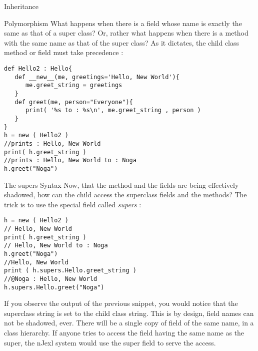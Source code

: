 \begin{section}{Inheritance}
\begin{subsection}{Polymorphism}
What happens when there is a field whose name
is exactly the same as that of a super class?
Or, rather what happens when there is a method
with the same name as that of the super class?
As it dictates, the child class method or field must
take precedence :

\begin{center}\begin{minipage}{\linewidth}
\begin{lstlisting}[style=JexlStyle]
def Hello2 : Hello{
   def __new__(me, greetings='Hello, New World'){
      me.greet_string = greetings
   } 
   def greet(me, person="Everyone"){
      print( '%s to : %s\n', me.greet_string , person )
   }  
}
h = new ( Hello2 )
//prints : Hello, New World
print( h.greet_string )
//prints : Hello, New World to : Noga
h.greet("Noga")
\end{lstlisting}  
\end{minipage}\end{center}

\end{subsection}

\begin{subsection}{The supers Syntax}
Now, that the method and the fields are being effectively shadowed, 
how can the child access the superclass fields and the methods?
The trick is to use the special field called \emph{supers} :

\begin{center}\begin{minipage}{\linewidth}
\begin{lstlisting}[style=JexlStyle]
h = new ( Hello2 )
// Hello, New World
print( h.greet_string )
// Hello, New World to : Noga
h.greet("Noga")
//Hello, New World
print ( h.supers.Hello.greet_string )
//@Noga : Hello, New World
h.supers.Hello.greet("Noga")
\end{lstlisting}  
\end{minipage}\end{center}
If you observe the output of the previous snippet,
you would notice that the superclass string is 
set to the child class string. This is by design, 
field names can not be shadowed, ever. 
There will be a single copy of field of the same name,
in a class hierarchy. If anyone tries to access
the field having the same name as the super, 
the nJexl system would use the super field to serve the access.  
\end{subsection}


\end{section}
